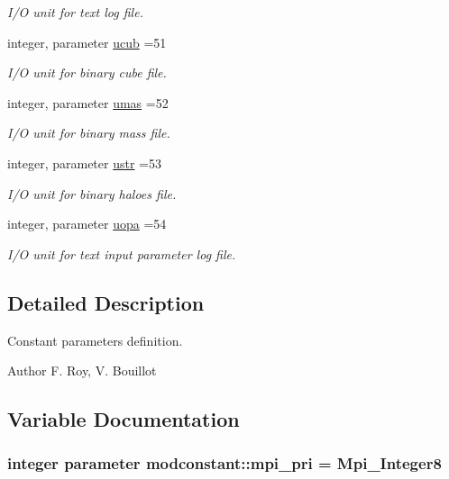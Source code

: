 \begin{DoxyCompactItemize}
\begin{DoxyCompactList}\small\item\em I/O unit for text log file. \end{DoxyCompactList}\item 
integer, parameter \hyperlink{namespacemodconstant_acb8d6ab8e571b34dcb11638e425e57db}{ucub} =51
\begin{DoxyCompactList}\small\item\em I/O unit for binary cube file. \end{DoxyCompactList}\item 
integer, parameter \hyperlink{namespacemodconstant_a542f50ea5e4225b1340cbcbca9eb30ee}{umas} =52
\begin{DoxyCompactList}\small\item\em I/O unit for binary mass file. \end{DoxyCompactList}\item 
integer, parameter \hyperlink{namespacemodconstant_a7ad4db4111cceef61b48e40126488f2d}{ustr} =53
\begin{DoxyCompactList}\small\item\em I/O unit for binary haloes file. \end{DoxyCompactList}\item 
integer, parameter \hyperlink{namespacemodconstant_a545e6e3d5c24f9ce81e3f88999f57b41}{uopa} =54
\begin{DoxyCompactList}\small\item\em I/O unit for text input parameter log file. \end{DoxyCompactList}\end{DoxyCompactItemize}


\subsection{Detailed Description}
Constant parameters definition. 

\begin{DoxyAuthor}{Author}
F. Roy, V. Bouillot 
\end{DoxyAuthor}


\subsection{Variable Documentation}
\subsubsection[{\texorpdfstring{mpi\+\_\+pri}{mpi_pri}}]{\setlength{\rightskip}{0pt plus 5cm}integer parameter modconstant\+::mpi\+\_\+pri = Mpi\+\_\+\+Integer8}\hypertarget{namespacemodconstant_a4c7b1b69a38bfb69c932e4a770dae783}{}\label{namespacemodconstant_a4c7b1b69a38bfb69c932e4a770dae783}


